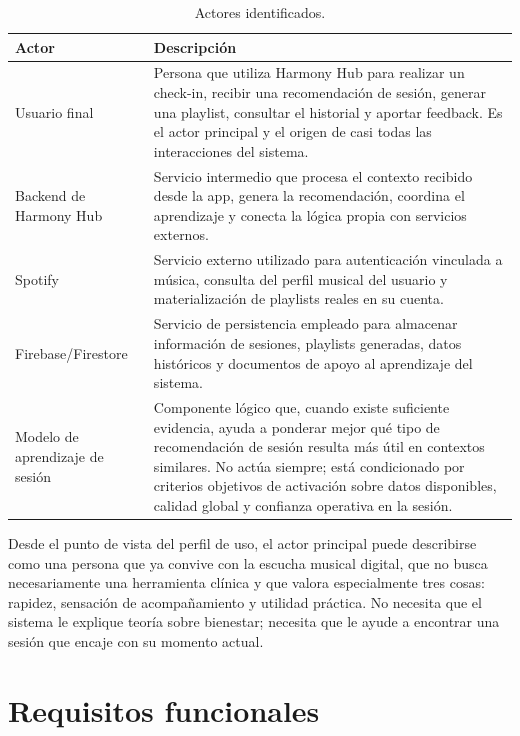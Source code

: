 \begin{table}[H]
\centering
\small
\renewcommand{\arraystretch}{1.1}
\begin{tabularx}{\textwidth}{|P{3.4cm}|Y|}
\hline
\textbf{Actor} & \textbf{Descripción} \\
\hline
Usuario final & Persona que utiliza Harmony Hub para realizar un check-in, recibir una recomendación de sesión, generar una playlist, consultar el historial y aportar feedback. Es el actor principal y el origen de casi todas las interacciones del sistema. \\
\hline
Backend de Harmony Hub & Servicio intermedio que procesa el contexto recibido desde la app, genera la recomendación, coordina el aprendizaje y conecta la lógica propia con servicios externos. \\
\hline
Spotify & Servicio externo utilizado para autenticación vinculada a música, consulta del perfil musical del usuario y materialización de playlists reales en su cuenta. \\
\hline
Firebase/Firestore & Servicio de persistencia empleado para almacenar información de sesiones, playlists generadas, datos históricos y documentos de apoyo al aprendizaje del sistema. \\
\hline
Modelo de aprendizaje de sesión & Componente lógico que, cuando existe suficiente evidencia, ayuda a ponderar mejor qué tipo de recomendación de sesión resulta más útil en contextos similares. No actúa siempre; está condicionado por criterios objetivos de activación sobre datos disponibles, calidad global y confianza operativa en la sesión. \\
\hline
\end{tabularx}
\caption{Actores identificados.}
\label{tab:actores}
\end{table}

Desde el punto de vista del perfil de uso, el actor principal puede describirse como una persona que ya convive con la escucha musical digital, que no busca necesariamente una herramienta clínica y que valora especialmente tres cosas: rapidez, sensación de acompañamiento y utilidad práctica. No necesita que el sistema le explique teoría sobre bienestar; necesita que le ayude a encontrar una sesión que encaje con su momento actual.

\section{Requisitos funcionales}
\label{sec:requisitos_funcionales}

